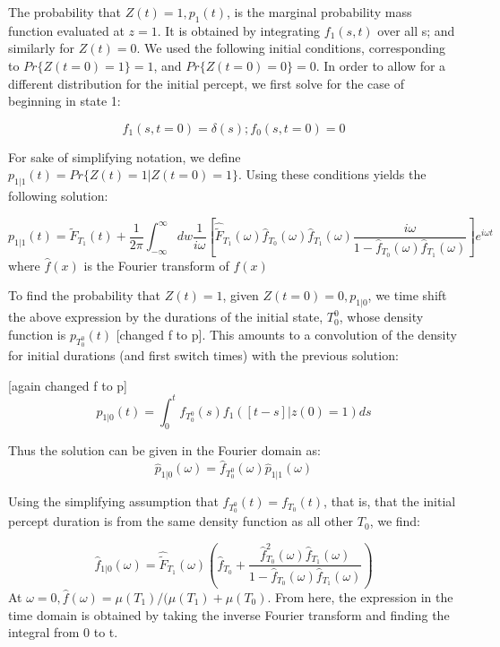 \documentclass{frontiersSCNS} %
\begin{document}
The probability that $Z(t)=1, p_1(t)$, is the marginal probability mass function evaluated at $z=1$. It is obtained by integrating $f_1(s,t)$ over all s; and similarly for $Z(t)=0$.
We used the following initial conditions, corresponding to $Pr \lbrace Z(t=0)=1 \rbrace=1$, and $Pr \lbrace Z(t=0)=0 \rbrace = 0$. In order to allow for a different distribution for the initial percept, we first solve for the case of beginning in state 1:

\begin{equation}
f_1(s,t=0) = \delta(s); f_0(s,t=0) = 0
\end{equation} 

For sake of simplifying notation, we define $p_{1|1}(t)=Pr \lbrace Z(t)=1|Z(t=0)=1 \rbrace$. Using these conditions yields the following solution:

\begin{equation}
p_{1|1}(t) = \tilde{F}_{T_1}(t) + \frac{1}{2\pi} \int_{-\infty}^\infty dw \frac{1}{i\omega} \left[ \hat{\tilde{F}}_{T_1}(\omega) \hat{f}_{T_0}(\omega)\hat{f}_{T_1}(\omega) \frac{i\omega}{1 - \hat{f}_{T_0}(\omega)\hat{f}_{T_1}(\omega)} \right] e^{i \omega t}
\end{equation}
where $\hat{f}(x)$ is the Fourier transform of $f(x)$

To find the probability that $Z(t)=1$, given $Z(t=0)=0, p_{1|0}$, we time shift the above expression by the durations of the initial state, $T_0^0$, whose density function is $p_{T_0^0}(t)$ [changed f to p]. This amounts to a convolution of the density for initial durations (and first switch times) with the previous solution:

[again changed f to p]
\begin{equation}
p_{1|0}(t) = \int_0^t f_{T_0^0}(s) f_{1}([t-s]|z(0)=1) ds
\end{equation}

Thus the solution can be given in the Fourier domain as:
\begin{equation}
\hat{p}_{1|0}(\omega) = \hat{f}_{T_0^0}(\omega) \hat{p}_{1|1} (\omega)
\end{equation}

Using the simplifying assumption that ${f}_{T_0^0}(t) = {f}_{T_0}(t)$, that is, that the initial percept duration is from the same density function as all other $T_0$, we find:
 
\begin{equation}
\hat{f}_{1|0}(\omega) = \hat{\tilde{F}}_{T_1}(\omega)
\left( \hat{f}_{T_0} + \frac{\hat{f}_{T_0}^2(\omega)\hat{f}_{T_1}(\omega)}{1-\hat{f}_{T_0}(\omega)\hat{f}_{T_1}(\omega)}\right)
\end{equation}
At $\omega = 0, \hat{f}(\omega) = \mu(T_1) / (\mu(T_1) + \mu(T_0)$. From here, the expression in the time domain is obtained by taking the inverse Fourier transform and finding the integral from 0 to t.  
\end{document}
